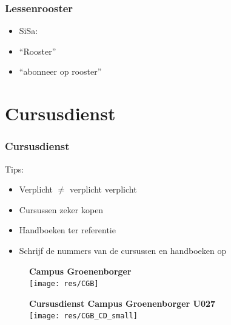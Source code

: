 \begin{frame}
	\frametitle{Lessenrooster}
	
	\begin{itemize}
		\item<1-> SiSa: 
		\item<1-> ``Rooster''
		\item<2-> ``abonneer op rooster''
	\end{itemize}
	
    
\end{frame}

\section{Cursusdienst}
\begin{frame}[allowframebreaks=10]
	\frametitle{Cursusdienst}
    \vspace{0.5cm}
    
    Tips:
    \begin{itemize}
        \item Verplicht $\neq$ verplicht verplicht
        \item Cursussen zeker kopen
        \item Handboeken ter referentie
        \item Schrijf de nummers van de cursussen en handboeken op
	\end{itemize}
    

    
    \framebreak
    \begin{figure}
       	\centering
        \vspace*{0.02cm}
        \textbf{Campus Groenenborger} \\
        \vspace{0.3cm}
       	\texttt{[image: res/CGB]}
    \end{figure}
    \framebreak
    \begin{figure}
       	\centering
        \vspace*{0.02cm}
        \textbf{Cursusdienst Campus Groenenborger U027} \\
        \vspace{0.3cm}
      	\texttt{[image: res/CGB\_CD\_small]}
    \end{figure}
\end{frame}

